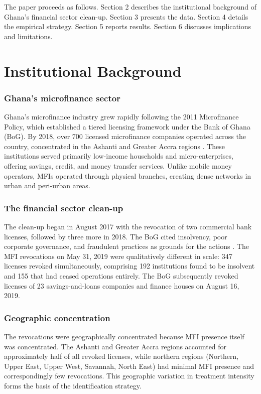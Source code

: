 \documentclass[12pt]{article}
\begin{document}
The paper proceeds as follows. Section 2 describes the institutional background of Ghana's financial sector clean-up. Section 3 presents the data. Section 4 details the empirical strategy. Section 5 reports results. Section 6 discusses implications and limitations.

\section{Institutional Background}

\subsubsection*{Ghana's microfinance sector} Ghana's microfinance industry grew rapidly following the 2011 Microfinance Policy, which established a tiered licensing framework under the Bank of Ghana (BoG). By 2018, over 700 licensed microfinance companies operated across the country, concentrated in the Ashanti and Greater Accra regions \citep{BoG2018AR}. These institutions served primarily low-income households and micro-enterprises, offering savings, credit, and money transfer services. Unlike mobile money operators, MFIs operated through physical branches, creating dense networks in urban and peri-urban areas.

\subsubsection*{The financial sector clean-up} The clean-up began in August 2017 with the revocation of two commercial bank licenses, followed by three more in 2018. The BoG cited insolvency, poor corporate governance, and fraudulent practices as grounds for the actions \citep{BoG2019}. The MFI revocations on May 31, 2019 were qualitatively different in scale: 347 licenses revoked simultaneously, comprising 192 institutions found to be insolvent and 155 that had ceased operations entirely. The BoG subsequently revoked licenses of 23 savings-and-loans companies and finance houses on August 16, 2019.

\subsubsection*{Geographic concentration} The revocations were geographically concentrated because MFI presence itself was concentrated. The Ashanti and Greater Accra regions accounted for approximately half of all revoked licenses, while northern regions (Northern, Upper East, Upper West, Savannah, North East) had minimal MFI presence and correspondingly few revocations. This geographic variation in treatment intensity forms the basis of the identification strategy.
\end{document}
